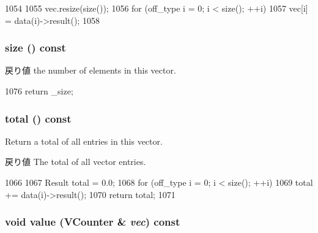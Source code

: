 \begin{DoxyCode}
1054     {
1055         vec.resize(size());
1056         for (off_type i = 0; i < size(); ++i)
1057             vec[i] = data(i)->result();
1058     }
\end{DoxyCode}
\hypertarget{classStats_1_1VectorBase_a503ab01f6c0142145d3434f6924714e7}{
\subsubsection[{size}]{ size () const}}
\label{classStats_1_1VectorBase_a503ab01f6c0142145d3434f6924714e7}
\begin{DoxyReturn}{戻り値}
the number of elements in this vector. 
\end{DoxyReturn}



\begin{DoxyCode}
1076 { return _size; }
\end{DoxyCode}
\hypertarget{classStats_1_1VectorBase_a35c6e2ed3fc81b40d69052a062113ead}{
\subsubsection[{total}]{ total () const}}
\label{classStats_1_1VectorBase_a35c6e2ed3fc81b40d69052a062113ead}
Return a total of all entries in this vector. \begin{DoxyReturn}{戻り値}
The total of all vector entries. 
\end{DoxyReturn}



\begin{DoxyCode}
1066     {
1067         Result total = 0.0;
1068         for (off_type i = 0; i < size(); ++i)
1069             total += data(i)->result();
1070         return total;
1071     }
\end{DoxyCode}
\hypertarget{classStats_1_1VectorBase_a0f4f8268e03f31887e29f7b5bb8fd9fe}{
\subsubsection[{value}]{\setlength{\rightskip}{0pt plus 5cm}void value ({\bf VCounter} \& {\em vec}) const}}
\label{classStats_1_1VectorBase_a0f4f8268e03f31887e29f7b5bb8fd9fe}



